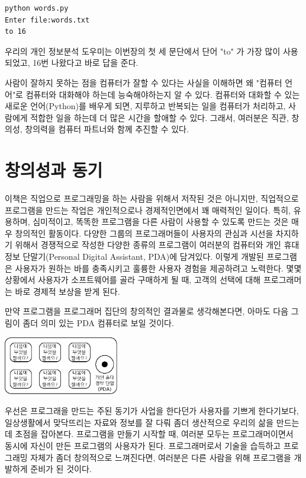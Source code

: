\beforeverb
\begin{verbatim}
python words.py
Enter file:words.txt
to 16
\end{verbatim}
\afterverb
%

우리의 개인 정보분석 도우미는 이번장의 첫 세 문단에서 단어 "to" 가 가장 많이 사용되었고, 16번 나왔다고 바로 답을 준다.

사람이 잘하지 못하는 점을 컴퓨터가 잘할 수 있다는 사실을 이해하면 왜 "컴퓨터 언어"로 컴퓨터와 대화해야 하는데 능숙해야하는지 알 수 있다. 
컴퓨터와 대화할 수 있는 새로운 언어(Python)를 배우게 되면, 
지루하고 반복되는 일을 컴퓨터가 처리하고, 
사람에게 적합한 일을 하는데 더 많은 시간을 할애할 수 있다.
그래서, 여러분은 직관, 창의성, 창의력을 컴퓨터 파트너와 함께 추진할 수 있다.

\section{창의성과 동기}
이책은 직업으로 프로그래밍을 하는 사람을 위해서 저작된 것은 아니지만, 
직업적으로 프로그램을 만드는 작업은 개인적으로나 경제적인면에서 꽤 매력적인 일이다. 
특히, 유용하며, 심미적이고, 똑똑한 프로그램을 다른 사람이 사용할 수 있도록 만드는 것은 매우 창의적인 활동이다. 
다양한 그룹의 프로그래머들이 사용자의 관심과 시선을 차지하기 위해서 경쟁적으로 작성한 다양한 종류의 프로그램이 여러분의 컴퓨터와 개인 휴대 정보 단말기(Personal Digital Assistant, PDA)에 담겨있다. 
이렇게 개발된 프로그램은 사용자가 원하는 바를 충족시키고 훌륭한 사용자 경험을 제공하려고 노력한다. 
몇몇 상황에서 사용자가 소프트웨어를 골라 구매하게 될 때, 고객의 선택에 대해 프로그래머는 바로 경제적 보상을 받게 된다.

만약 프로그램을 프로그래머 집단의 창의적인 결과물로 생각해본다면, 
아마도 다음 그림이 좀더 의미 있는 PDA 컴퓨터로 보일 것이다.

\beforefig
\centerline{\includegraphics[height=1.00in]{figs2/pda2.eps}}
\afterfig

우선은 프로그래을 만드는 주된 동기가 사업을 한다던가 사용자를 기쁘게 한다기보다,
일상생활에서 맞닥뜨리는 자료와 정보를 잘 다뤄 좀더 생산적으로 우리의 삶을 만드는데 초점을 잡아본다. 
프로그램을 만들기 시작할 때, 여러분 모두는 프로그래머이면서 동시에 자신이 만든 프로그램의 사용자가 된다. 
프로그래머로서 기술을 습득하고 프로그래밍 자체가 좀더 창의적으로 느껴진다면, 여러분은 다른 사람을 위해 프로그램을 개발하게 준비가 된 것이다.

